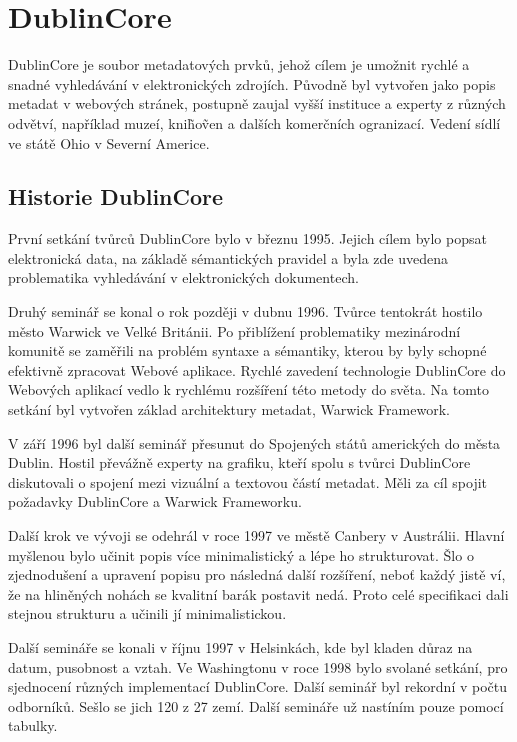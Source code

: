 \section{DublinCore}
\par DublinCore\cite{dublincoredocementation} je soubor metadatových prvků, jehož cílem je umožnit rychlé a snadné vyhledávání v elektronických zdrojích. Původně byl vytvořen jako popis metadat v webových stránek, postupně zaujal vyšší instituce a experty z různých odvětví, například muzeí, kni\~ho\~ven a dalších komerčních ogranizací. Vedení sídlí ve státě Ohio v Severní Americe.

\subsection{Historie DublinCore}
\par První setkání tvůrců DublinCore\cite{dublincoredocementation} bylo v březnu 1995. Jejich cílem bylo popsat elektronická data, na základě sémantických pravidel a byla zde uvedena problematika vyhledávání v elektronických dokumentech.

\par Druhý seminář se konal o rok později v dubnu 1996. Tvůrce tentokrát hostilo město Warwick ve Velké Británii. Po přiblížení problematiky mezinárodní komunitě se zaměřili na problém syntaxe a sémantiky, kterou by byly schopné efektivně zpracovat Webové aplikace. Rychlé zavedení technologie DublinCore do Webových aplikací vedlo k rychlému rozšíření této metody do světa. Na tomto setkání byl vytvořen základ architektury metadat, Warwick Framework.

\par V září 1996 byl další seminář přesunut do Spojených států amerických do města Dublin. Hostil převážně experty na grafiku, kteří spolu s tvůrci DublinCore diskutovali o spojení mezi vizuální a textovou částí metadat. Měli za cíl spojit požadavky DublinCore a Warwick Frameworku.

\par Další krok ve vývoji se odehrál v roce 1997 ve městě Canbery v Austrálii. Hlavní myšlenou bylo učinit popis více minimalistický a lépe ho strukturovat. Šlo o zjednodušení a upravení popisu pro následná další rozšíření, neboť každý jistě ví, že na hliněných nohách se kvalitní barák postavit nedá. Proto celé specifikaci dali stejnou strukturu a učinili jí minimalistickou.

\par Další semináře se konali v říjnu 1997 v Helsinkách, kde byl kladen důraz na datum, pusobnost a vztah. Ve Washingtonu v roce 1998 bylo svolané setkání, pro sjednocení různých implementací DublinCore. Další seminář byl rekordní v počtu odborníků. Sešlo se jich 120 z 27 zemí. Další semináře už nastíním pouze pomocí tabulky.

